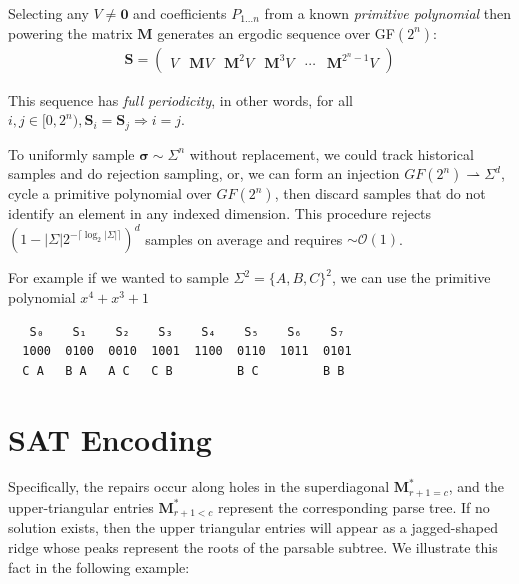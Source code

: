 \documentclass[sigplan,nonacm]{acmart}\settopmatter{printfolios=false,printccs=false,printacmref=false}
\begin{document}
Selecting any $V \neq \mathbf{0}$ and coefficients $P_{1\ldots n}$ from a known \textit{primitive polynomial} then powering the matrix $\mathbf{M}$ generates an ergodic sequence over GF$(2^n)$:\\

\begin{align}
    \mathbf{S} = \begin{pmatrix}V & \mathbf{M}V & \mathbf{M}^{2}V & \mathbf{M}^{3}V & \cdots & \mathbf{M}^{2^n-1}V \end{pmatrix}
\end{align}

\noindent This sequence has \textit{full periodicity}, in other words, for all $i, j \in [0, 2^n), \mathbf{S}_i = \mathbf{S}_j \Rightarrow i = j$.


To uniformly sample $\bm\sigma \sim \Sigma^n$ without replacement, we could track historical samples and do rejection sampling, or, we can form an injection $GF(2^n)\rightharpoonup\Sigma^d$, cycle a primitive polynomial over $GF(2^n)$, then discard samples that do not identify an element in any indexed dimension. This procedure rejects $(1 - |\Sigma|2^{-\lceil\log_2|\Sigma|\rceil})^d$ samples on average and requires $\sim\mathcal{O}(1)$.

For example if we wanted to sample $\Sigma^2 = \{A, B, C\}^2$, we can use the primitive polynomial $x^4 + x^3 +1$

\begin{verbatim}
   S₀    S₁    S₂    S₃    S₄    S₅    S₆    S₇
  1000  0100  0010  1001  1100  0110  1011  0101
  C A   B A   A C   C B         B C         B B
\end{verbatim}

\pagebreak
\section{SAT Encoding}\label{sec:sat}

Specifically, the repairs occur along holes in the superdiagonal $\mathbf{M}^*_{r+1 = c}$, and the upper-triangular entries $\mathbf{M}^*_{r + 1 < c}$ represent the corresponding parse tree. If no solution exists, then the upper triangular entries will appear as a jagged-shaped ridge whose peaks represent the roots of the parsable subtree. We illustrate this fact in the following example:
\end{document}
